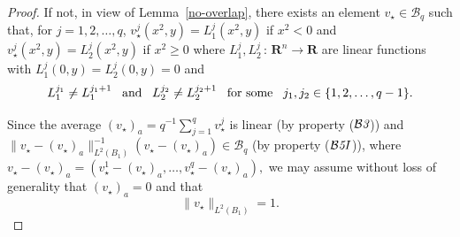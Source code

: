 \documentclass[a4paper,11pt]{amsart}
\begin{document}
\begin{proof} If not, in view of Lemma~\ref{no-overlap}, there exists an element $v_{\star} \in {\mathcal B}_{q}$ 
such that, for $j=1, 2, \ldots, q$, $v_{\star}^{j}(x^{2}, y) = L_{1}^{j}(x^{2}, y)$ if $x^{2} < 0$ and $v_{\star}^{j}(x^{2}, y) = L_{2}^{j}(x^{2}, y)$ if $x^{2} \geq 0$  where $L_{1}^{j}, L_{2}^{j} \, : \, {\mathbf R}^{n} \to {\mathbf R}$ are linear functions with $L_{1}^{j}(0,y) = L_{2}^{j}(0, y) = 0$ and 
\begin{equation}\label{partIII-0-0}
L_{1}^{j_{1}} \neq L_{1}^{j_{1}+1} \;\;\; {\rm and} \;\;\;L_{2}^{j_{2}} \neq L_{2}^{j_{2} +1} \;\;\; \mbox{for some} \;\;\; j_{1}, j_{2} \in \{1, 2, \ldots, q-1\}.
\end{equation}


Since  the average $(v_{\star})_{a} = q^{-1}\sum_{j=1}^{q} v_{\star}^{j}$ is linear (by property (${\mathcal B{\emph 3}}$)) and 
$\|v_{\star} - (v_{\star})_{a}\|_{L^{2}(B_{1})}^{-1}(v_{\star} - (v_{\star})_{a}) \in {\mathcal B}_{q}$ (by property (${\mathcal B{\emph 5I}}$)), where $v_{\star} - (v_{\star})_{a} = (v_{\star}^{1} - (v_{\star})_{a}, \ldots, v_{\star}^{q} - (v_{\star})_{a}),$ we may assume without loss of generality that $(v_{\star})_{a} = 0$ and that
\begin{equation}\label{partIII-0}
\|v_{\star}\|_{L^{2}(B_{1})} = 1.
\end{equation}


\end{proof}
\end{document}
